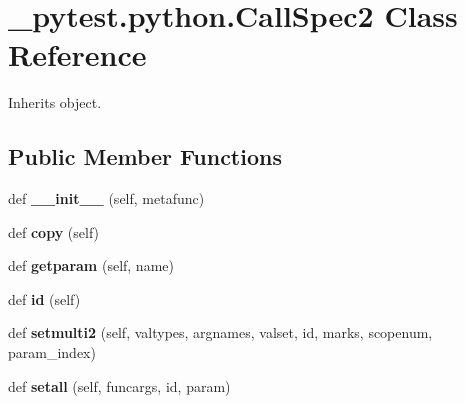 \hypertarget{class__pytest_1_1python_1_1_call_spec2}{}\section{\+\_\+pytest.\+python.\+Call\+Spec2 Class Reference}
\label{class__pytest_1_1python_1_1_call_spec2}


Inherits object.

\subsection*{Public Member Functions}
\begin{DoxyCompactItemize}
\item 
\mbox{\label{class__pytest_1_1python_1_1_call_spec2_a9e01f29b106d4d424448f72b6a39b507}} 
def {\bfseries \+\_\+\+\_\+init\+\_\+\+\_\+} (self, metafunc)
\item 
\mbox{\label{class__pytest_1_1python_1_1_call_spec2_a5b1a55cd6d90db88cdcdc7e0d4a565d1}} 
def {\bfseries copy} (self)
\item 
\mbox{\label{class__pytest_1_1python_1_1_call_spec2_a6252a2742d1f4c15ac4ca42ec00568c3}} 
def {\bfseries getparam} (self, name)
\item 
\mbox{\label{class__pytest_1_1python_1_1_call_spec2_a096a27eca14dd09c8c93f8c5ddb49ae9}} 
def {\bfseries id} (self)
\item 
\mbox{\label{class__pytest_1_1python_1_1_call_spec2_adc2610512f171fe125c8e081caedb02f}} 
def {\bfseries setmulti2} (self, valtypes, argnames, valset, id, marks, scopenum, param\+\_\+index)
\item 
\mbox{\label{class__pytest_1_1python_1_1_call_spec2_a5563cd438f17efe5ae8f5bf8a936628a}} 
def {\bfseries setall} (self, funcargs, id, param)
\end{DoxyCompactItemize}
